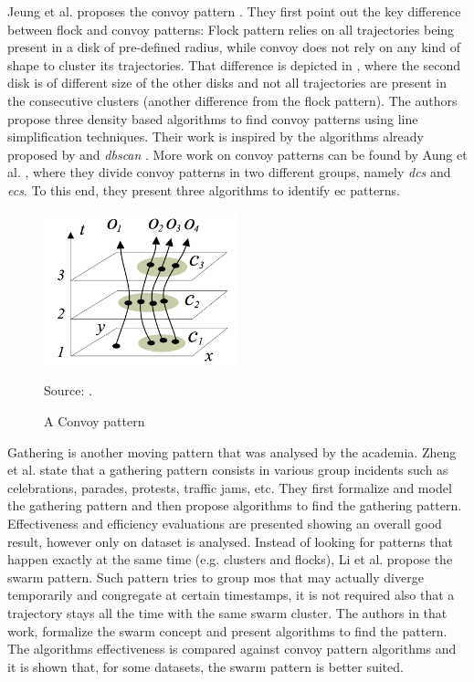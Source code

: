 Jeung et al. proposes the convoy pattern \citep{convoy2}\citep{convoy}. They first point out the key difference between
flock and convoy patterns: Flock pattern relies on all trajectories being present in a disk of pre-defined radius, while
convoy does not rely on any kind of shape to cluster its trajectories. That difference is depicted in
, where the second disk is of different size of the other disks and not all trajectories are
present in the consecutive clusters (another difference from the flock pattern). The authors propose three density based
algorithms to find convoy patterns using line simplification techniques. Their work is inspired by the algorithms
already proposed by \citep{movingclusters} and \textit{\ac{dbscan}} \citep{dbscan}. More work on convoy patterns can be
found by Aung et al. \citep{convoy3}, where they divide convoy patterns in two different groups, namely
\textit{\acp{dc}} and \textit{\acp{ec}}. To this end, they present three algorithms to identify \ac{ec} patterns.

\begin{figure}
    \centering
    \caption{A Convoy pattern}
    \centerline{\includegraphics[width=0.5\textwidth]{images/convoy.png}}
    \footnotesize{Source: \citep{convoy2}.}
    \label{fig:convoy_pattern}
\end{figure}

Gathering is another moving pattern that was analysed by the academia. Zheng et al. \citep{gathering} state that a
gathering pattern consists in various group incidents such as celebrations, parades, protests, traffic jams, etc. They
first formalize and model the gathering pattern and then propose algorithms to find the gathering pattern. Effectiveness
and efficiency evaluations are presented showing an overall good result, however only on dataset is analysed. Instead of
looking for patterns that happen exactly at the same time (e.g. clusters and flocks), Li et al. \citep{swarm} propose
the swarm pattern. Such pattern tries to group \acp{mo} that may actually diverge temporarily and congregate at certain
timestamps, it is not required also that a trajectory stays all the time with the same swarm cluster. The authors in
that work, formalize the swarm concept and present algorithms to find the pattern. The algorithms effectiveness is
compared against convoy pattern algorithms and it is shown that, for some datasets, the swarm pattern is better suited.

